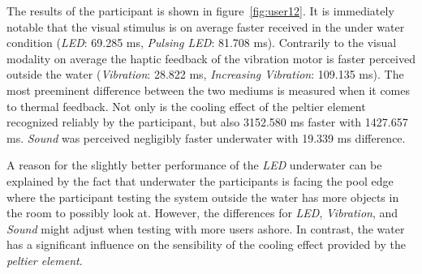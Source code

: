 The results of the participant is shown in figure~\ref{fig:user12}.
It is immediately notable that the visual stimulus is on average faster received in the under water condition (\emph{LED}: 69.285 ms, \emph{Pulsing LED}: 81.708 ms).
Contrarily to the visual modality on average the haptic feedback of the vibration motor is faster perceived outside the water (\emph{Vibration}: 28.822 ms, \emph{Increasing Vibration}: 109.135 ms).
The most preeminent difference between the two mediums is measured when it comes to thermal feedback.
Not only is the cooling effect of the peltier element recognized reliably by the participant, but also 3152.580 ms faster with 1427.657 ms.
\emph{Sound} was perceived negligibly faster underwater with 19.339 ms difference.


A reason for the slightly better performance of the \emph{LED} underwater can be explained by the fact that underwater the participants is facing the pool edge where the participant testing the system outside the water has more objects in the room to possibly look at. 
However, the differences for \emph{LED}, \emph{Vibration}, and \emph{Sound} might adjust when testing with more users ashore.
In contrast, the water has a significant influence on the sensibility of the cooling effect provided by the \emph{peltier element}.





























